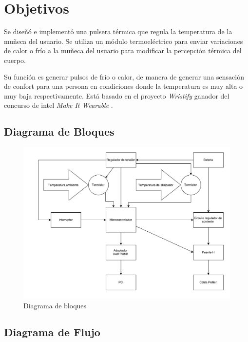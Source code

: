 \documentclass[10pt,spanish,a4paper,openany,notitlepage]{article}
\begin{document}
\tableofcontents
\newpage

\section{Objetivos}
Se diseñó e implementó una pulsera térmica que regula la temperatura
de la muñeca del usuario. Se utiliza un módulo termoeléctrico para enviar
variaciones de calor o frío a la muñeca del usuario para modificar
la percepción térmica del cuerpo.

Su función es generar pulsos de frío o calor, de manera de generar una sensación de 
confort para una persona en condiciones donde la temperatura es muy alta 
o muy baja respectivamente.
Está basado en el proyecto \emph{Wristify} \cite{embrlabs} ganador del concurso de intel 
\emph{Make It Wearable} \cite{Make It Wearable}.

\subsection{Diagrama de Bloques}

\begin{figure}[H] %
\begin{center}
\includegraphics[scale=0.55]{./imagenes/diagrama_de_bloques.pdf}
\caption{Diagrama de bloques}
 \label{fig:diag_bloques}
\end{center}
\end{figure}



\subsection{Diagrama de Flujo}
\end{document}
